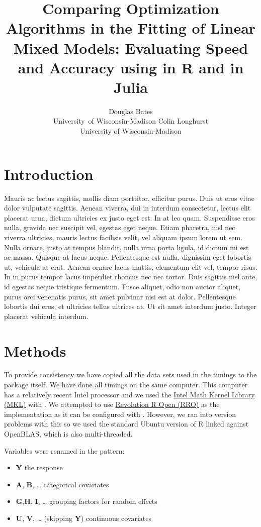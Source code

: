 \documentclass[article]{jss}
\author{Douglas Bates\\University\ of Wisconsin-Madison \And 
        Colin Longhurst \\University of Wisconsin-Madison}
\title{Comparing Optimization Algorithms in the Fitting of Linear Mixed Models: Evaluating Speed and Accuracy using \pkg{lme4} in R and \pkg{lmm} in Julia}
\begin{document}

\section[Introduction]{Introduction}

Mauris ac lectus sagittis, mollis diam porttitor, efficitur purus. Duis ut eros vitae dolor vulputate sagittis. Aenean viverra, dui in interdum consectetur, lectus elit placerat urna, dictum ultricies ex justo eget est. In at leo quam. Suspendisse eros nulla, gravida nec suscipit vel, egestas eget neque. Etiam pharetra, nisl nec viverra ultricies, mauris lectus facilisis velit, vel aliquam ipsum lorem ut sem. Nulla ornare, justo at tempus blandit, nulla urna porta ligula, id dictum mi est ac massa. Quisque at lacus neque. Pellentesque est nulla, dignissim eget lobortis ut, vehicula at erat. Aenean ornare lacus mattis, elementum elit vel, tempor risus. In in purus tempor lacus imperdiet rhoncus nec nec tortor. Duis sagittis nisl ante, id egestas neque tristique fermentum. Fusce aliquet, odio non auctor aliquet, purus orci venenatis purus, sit amet pulvinar nisi est at dolor. Pellentesque lobortis dui eros, et ultricies tellus ultrices at. Ut sit amet interdum justo. Integer placerat vehicula interdum. 

\section[Methods]{Methods}


To provide consistency we have copied all the data sets used in the
timings to the  package itself. We have done all timings
on the same computer. This computer has a relatively recent Intel
processor and we used the
\href{https://software.intel.com/en-us/intel-mkl}{Intel Math Kernel
Library (MKL)} with . We attempted to use
\href{www.revolutionanalytics.com/revolution-r-open}{Revolution R Open
(RRO)} as the  implementation as it can be configured with .
However, we ran into version problems with this so we used the standard
Ubuntu version of R linked against OpenBLAS, which is also
multi-threaded.

Variables were renamed in the pattern: 

\begin{itemize}
\item \textbf{Y} the response 
\item \textbf{A}, \textbf{B}, \dots{} categorical covariates 
\item \textbf{G},\textbf{H}, \textbf{I}, \dots{} grouping factors for random effects 
\item \textbf{U}, \textbf{V}, \dots{} (skipping \textbf{Y}) continuous covariates
\end{itemize}
\end{document}
